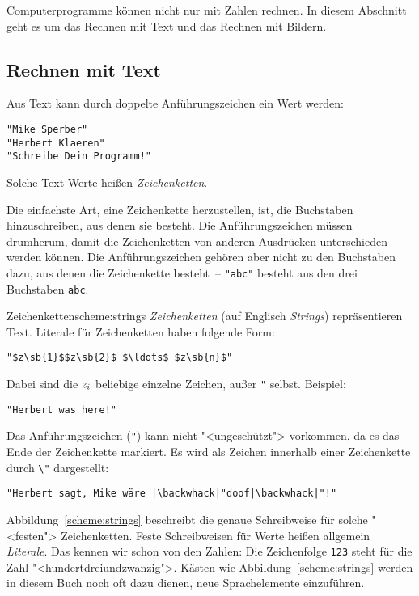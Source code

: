 Computerprogramme können nicht nur mit Zahlen rechnen.  In diesem
Abschnitt geht es um das Rechnen mit Text und das Rechnen mit Bildern.

\subsection{Rechnen mit Text}

Aus Text kann durch doppelte Anführungszeichen ein Wert werden:
%
\begin{lstlisting}
"Mike Sperber"
"Herbert Klaeren"
"Schreibe Dein Programm!"
\end{lstlisting}
%
Solche Text-Werte heißen \textit{Zeichenketten}.

Die einfachste Art, eine Zeichenkette herzustellen, ist, die
Buchstaben hinzuschreiben, aus denen sie besteht.  Die
Anführungszeichen müssen drumherum, damit die Zeichenketten von anderen
Ausdrücken unterschieden werden können.  Die Anführungszeichen gehören aber nicht
zu den Buchstaben dazu, aus denen die Zeichenkette besteht~--
\lstinline{"abc"} besteht aus den drei Buchstaben \texttt{abc}.

\begin{feature}{Zeichenketten}{scheme:strings}
\textit{Zeichenketten} (auf Englisch
\textit{Strings}) repräsentieren Text.
Literale für Zeichenketten haben folgende Form:
%
\begin{lstlisting}
"$z\sb{1}$$z\sb{2}$ $\ldots$ $z\sb{n}$"
\end{lstlisting}
%
Dabei sind die \(z\sb{i}\) beliebige einzelne Zeichen, außer \lstinline{"} selbst.
Beispiel:
%
\begin{lstlisting}
"Herbert was here!"
\end{lstlisting}
%
Das Anführungszeichen (\lstinline{"}) kann nicht "<ungeschützt"> vorkommen, da es das Ende der
Zeichenkette markiert. Es wird als Zeichen innerhalb einer Zeichenkette
durch \lstinline{\"} dargestellt:
%
\begin{lstlisting}
"Herbert sagt, Mike wäre |\backwhack|"doof|\backwhack|"!"
\end{lstlisting}
\end{feature}

Abbildung~\ref{scheme:strings} beschreibt die genaue Schreibweise für
solche "<festen"> Zeichenketten.  Feste Schreibweisen für Werte heißen
allgemein \textit{Literale}.  Das kennen wir schon von
den Zahlen: Die Zeichenfolge \lstinline{123} steht für die Zahl
"<hundertdreiundzwanzig">.  Kästen wie Abbildung~\ref{scheme:strings}
werden in diesem Buch noch oft dazu dienen, neue Sprachelemente
einzuführen.

